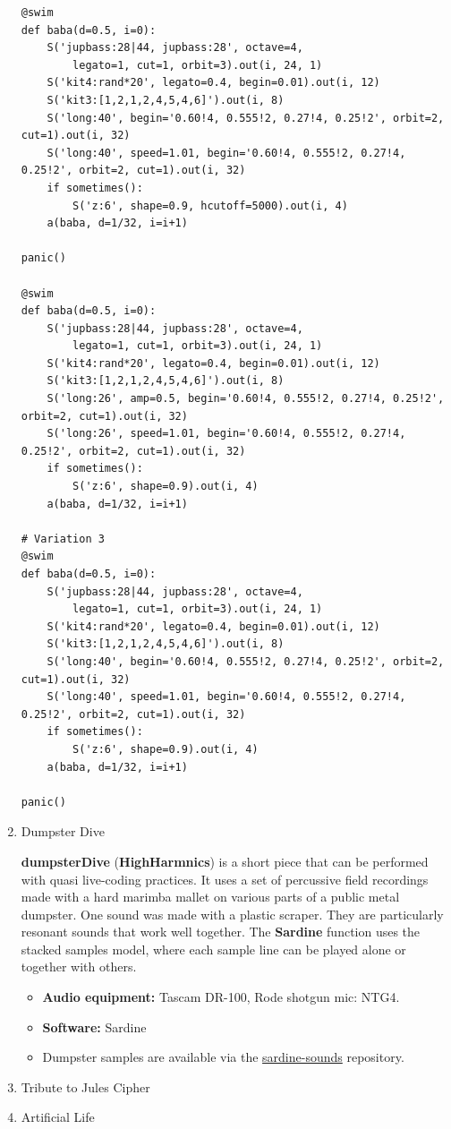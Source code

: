 \documentclass[11pt]{article}
\begin{document}
\begin{enumerate}
\begin{verbatim}
@swim
def baba(d=0.5, i=0):
    S('jupbass:28|44, jupbass:28', octave=4,
        legato=1, cut=1, orbit=3).out(i, 24, 1)
    S('kit4:rand*20', legato=0.4, begin=0.01).out(i, 12)
    S('kit3:[1,2,1,2,4,5,4,6]').out(i, 8)
    S('long:40', begin='0.60!4, 0.555!2, 0.27!4, 0.25!2', orbit=2, cut=1).out(i, 32)
    S('long:40', speed=1.01, begin='0.60!4, 0.555!2, 0.27!4, 0.25!2', orbit=2, cut=1).out(i, 32)
    if sometimes():
        S('z:6', shape=0.9, hcutoff=5000).out(i, 4)
    a(baba, d=1/32, i=i+1)

panic()

@swim
def baba(d=0.5, i=0):
    S('jupbass:28|44, jupbass:28', octave=4,
        legato=1, cut=1, orbit=3).out(i, 24, 1)
    S('kit4:rand*20', legato=0.4, begin=0.01).out(i, 12)
    S('kit3:[1,2,1,2,4,5,4,6]').out(i, 8)
    S('long:26', amp=0.5, begin='0.60!4, 0.555!2, 0.27!4, 0.25!2', orbit=2, cut=1).out(i, 32)
    S('long:26', speed=1.01, begin='0.60!4, 0.555!2, 0.27!4, 0.25!2', orbit=2, cut=1).out(i, 32)
    if sometimes():
        S('z:6', shape=0.9).out(i, 4)
    a(baba, d=1/32, i=i+1)

# Variation 3
@swim
def baba(d=0.5, i=0):
    S('jupbass:28|44, jupbass:28', octave=4,
        legato=1, cut=1, orbit=3).out(i, 24, 1)
    S('kit4:rand*20', legato=0.4, begin=0.01).out(i, 12)
    S('kit3:[1,2,1,2,4,5,4,6]').out(i, 8)
    S('long:40', begin='0.60!4, 0.555!2, 0.27!4, 0.25!2', orbit=2, cut=1).out(i, 32)
    S('long:40', speed=1.01, begin='0.60!4, 0.555!2, 0.27!4, 0.25!2', orbit=2, cut=1).out(i, 32)
    if sometimes():
        S('z:6', shape=0.9).out(i, 4)
    a(baba, d=1/32, i=i+1)

panic()
\end{verbatim}

\item Dumpster Dive
\label{sec:org94e2092}

\textbf{dumpsterDive} (\textbf{HighHarmnics}) is a short piece that can be performed with quasi live-coding practices. It uses a set of percussive field recordings made with a hard marimba mallet on various parts of a public metal dumpster. One sound was made with a plastic scraper. They are particularly resonant sounds that work well together. The \textbf{Sardine} function uses the stacked samples model, where each sample line can be played alone or together with others.

\begin{itemize}
\item \textbf{Audio equipment:} Tascam DR-100, Rode shotgun mic: NTG4.
\item \textbf{Software:} Sardine
\item Dumpster samples are available via the \href{https://github.com/Bubobubobubobubo/sardine-sounds}{sardine-sounds} repository.
\end{itemize}


\item Tribute to Jules Cipher
\label{sec:orgd760160}
\item Artificial Life
\label{sec:orgf65bffb}
\end{enumerate}
\end{document}
